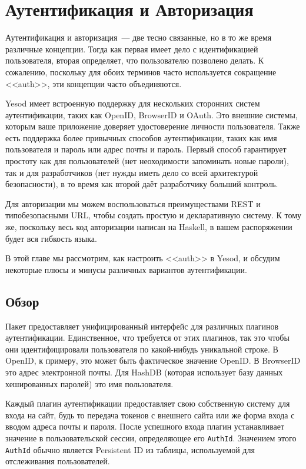 \chapter{Аутентификация и Авторизация}\label{chap:auth}

Аутентификация и авторизация~--- две тесно связанные, но в то же время
различные концепции. Тогда как первая имеет дело с идентификацией пользователя,
вторая определяет, что пользователю позволено делать. К сожалению, поскольку
для обоих терминов часто используется сокращение <<auth>>, эти концепции часто
объединяются.

Yesod имеет встроенную поддержку для нескольких сторонних систем
аутентификации, таких как OpenID, BrowserID и OAuth. Это внешние системы,
которым ваше приложение доверяет удостоверение личности пользователя. Также
есть поддержка более привычных способов аутентификации, таких как имя
пользователя и пароль или адрес почты и пароль. Первый способ гарантирует
простоту как для пользователей (нет неоходимости запоминать новые пароли), так
и для разработчиков (нет нужды иметь дело со всей архитектурой безопасности), в
то время как второй даёт разработчику больший контроль.

Для авторизации мы можем воспользоваться преимуществами REST и типобезопасными
URL, чтобы создать простую и декларативную систему. К тому же, поскольку весь
код авторизации написан на Haskell, в вашем распоряжении будет вся гибкость
языка.

В этой главе мы рассмотрим, как настроить <<auth>> в Yesod, и обсудим некоторые
плюсы и минусы различных вариантов аутентификации.

\section{Обзор}


Пакет 
предоставляет унифицированный интерфейс для различных плагинов аутентификации.
Единственное, что требуется от этих плагинов, так это чтобы они
идентифицировали пользователя по какой-нибудь уникальной строке. В OpenID, к
примеру, это может быть фактическое значение OpenID. В BrowserID это адрес
электронной почты. Для HashDB (которая использует базу данных хешированных
паролей) это имя пользователя.

Каждый плагин аутентификации предоставляет свою собственную систему для входа
на сайт, будь то передача токенов с внешнего сайта или же форма входа с вводом
адреса почты и пароля. После успешного входа плагин устанавливает значение в
пользовательской сессии, определяющее его \lstinline'AuthId'. Значением этого
\lstinline'AuthId' обычно является Persistent ID из таблицы, используемой для
отслеживания пользователей.

